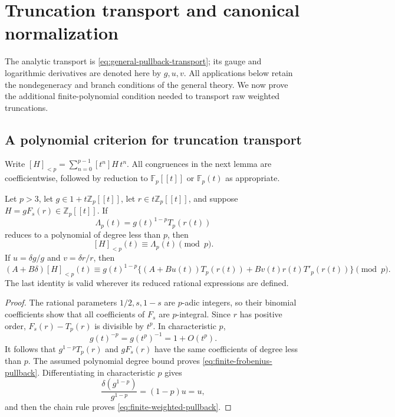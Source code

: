 \section{Truncation transport and canonical normalization}
\label{rev:truncations}
\label{sec:general-pullbacks}
The analytic transport is \eqref{eq:general-pullback-transport}; its
gauge and logarithmic derivatives are denoted here by $g,u,v$.
All applications below retain the nondegeneracy and branch conditions
of the general theory. We now prove the additional finite-polynomial
condition needed to transport raw weighted truncations.
\subsection{A polynomial criterion for truncation transport}

Write $[H]_{<p}=\sum_{n=0}^{p-1}[t^n]H\,t^n$.
All congruences in the next lemma are coefficientwise, followed by
reduction to $\mathbb F_p[[t]]$ or $\mathbb F_p(t)$ as appropriate.

\begin{lemma}
\label{lem:finite-frobenius-pullback}
Let $p>3$, let $g\in1+t\mathbb Z_p[[t]]$, let
$r\in t\mathbb Z_p[[t]]$, and suppose
$H=gF_s(r)\in\mathbb Z_p[[t]]$.
If
\[
 \Lambda_p(t)=g(t)^{1-p}T_p(r(t))
\]
reduces to a polynomial of degree less than $p$, then
\begin{equation}\label{eq:finite-frobenius-pullback}
 [H]_{<p}(t)\equiv\Lambda_p(t)\pmod p.
\end{equation}
If $u=\delta g/g$ and $v=\delta r/r$, then
\begin{equation}\label{eq:finite-weighted-pullback}
 (A+B\delta)[H]_{<p}(t)
 \equiv g(t)^{1-p}
 \bigl\{(A+Bu(t))T_p(r(t))
        +Bv(t)r(t)T'_p(r(t))\bigr\}\pmod p.
\end{equation}
The last identity is valid wherever its reduced rational expressions
are defined.
\end{lemma}
\begin{proof}
The rational parameters $1/2,s,1-s$ are $p$-adic integers, so their
binomial coefficients show that all coefficients of $F_s$ are
$p$-integral.  Since $r$ has positive order,
$F_s(r)-T_p(r)$ is divisible by $t^p$.  In characteristic $p$,
\[
 g(t)^{-p}=g(t^p)^{-1}=1+O(t^p).
\]
It follows that $g^{1-p}T_p(r)$ and $gF_s(r)$ have the same
coefficients of degree less than $p$.  The assumed polynomial degree
bound proves \eqref{eq:finite-frobenius-pullback}.  Differentiating
in characteristic $p$ gives
\[
 \frac{\delta(g^{1-p})}{g^{1-p}}=(1-p)u=u,
\]
and then the chain rule proves
\eqref{eq:finite-weighted-pullback}.
\end{proof}

